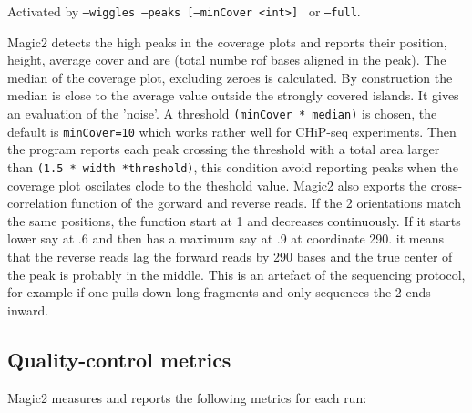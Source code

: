 \documentclass[11pt]{article}
\newcommand{\code}[1]{\texttt{#1}}
\begin{document}
Activated by \code{--wiggles --peaks [--minCover <int>] } or \code{--full}.

Magic2 detects the high peaks in the coverage plots and reports
their position, height, average cover and are (total numbe rof bases aligned in the peak).
The median of the coverage plot, excluding zeroes is calculated. By construction the
median is close to the average value outside the strongly covered islands. It gives an
evaluation of the 'noise'. A threshold \code{(minCover * median)} is chosen, the default
is \code{minCover=10} which works rather well for CHiP-seq experiments. Then the program
reports each peak crossing the threshold with a total area larger than \code{(1.5 * width *threshold)},
this condition avoid reporting peaks when the coverage plot oscilates clode to the
theshold value. Magic2 also exports the cross-correlation function of the gorward and reverse reads.
If the 2 orientations match the same positions, the function start at 1 and decreases continuously.
If it starts lower say at .6 and then has a maximum say at .9 at coordinate 290. it means that the
reverse reads lag the forward reads by 290 bases and the true center of the peak is probably
in the middle. This is an artefact of the sequencing protocol, for example if one pulls down
long fragments and only sequences the 2 ends inward. 

\subsection{Quality-control metrics}
\label{sec:qcmetrics}

Magic2 measures and reports the following metrics for each run:
\end{document}
